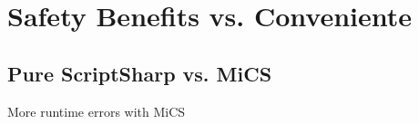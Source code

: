 
\section{Safety Benefits vs. Conveniente} %
\label{sec:safety_benefits_vs_conveniente}

\subsection{Pure ScriptSharp vs. MiCS} %
\label{sub:pure_scriptsharp_vs_mics}
More runtime errors with MiCS


